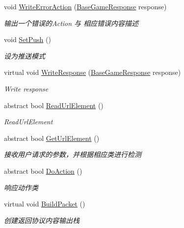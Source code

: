 \begin{DoxyCompactItemize}
void \mbox{\hyperlink{class_t_net_1_1_service_1_1_game_struct_a14afa6149ce4830eebbb13420cb24507}{Write\+Error\+Action}} (\mbox{\hyperlink{class_t_net_1_1_service_1_1_base_game_response}{Base\+Game\+Response}} response)
\begin{DoxyCompactList}\small\item\em 输出一个错误的\+Action 与 相应错误内容描述 \end{DoxyCompactList}\item 
void \mbox{\hyperlink{class_t_net_1_1_service_1_1_game_struct_a0d368920d892f3948113651765bbefc4}{Set\+Push}} ()
\begin{DoxyCompactList}\small\item\em 设为推送模式 \end{DoxyCompactList}\item 
virtual void \mbox{\hyperlink{class_t_net_1_1_service_1_1_game_struct_a1e9ea47b126ecae6d9b7e1c813d053b2}{Write\+Response}} (\mbox{\hyperlink{class_t_net_1_1_service_1_1_base_game_response}{Base\+Game\+Response}} response)
\begin{DoxyCompactList}\small\item\em Write response \end{DoxyCompactList}\item 
abstract bool \mbox{\hyperlink{class_t_net_1_1_service_1_1_game_struct_ab30ab74b0856742fd3da24539b94fb13}{Read\+Url\+Element}} ()
\begin{DoxyCompactList}\small\item\em Read\+Url\+Element \end{DoxyCompactList}\item 
abstract bool \mbox{\hyperlink{class_t_net_1_1_service_1_1_game_struct_ad4167cb7ce62183a1336ebc30a848bfc}{Get\+Url\+Element}} ()
\begin{DoxyCompactList}\small\item\em 接收用户请求的参数，并根据相应类进行检测 \end{DoxyCompactList}\item 
abstract bool \mbox{\hyperlink{class_t_net_1_1_service_1_1_game_struct_a7a4391eb55bba0a76637b1d58e6fdea9}{Do\+Action}} ()
\begin{DoxyCompactList}\small\item\em 响应动作类 \end{DoxyCompactList}\item 
virtual void \mbox{\hyperlink{class_t_net_1_1_service_1_1_game_struct_a07c2501acfc1957399e45b1c3539bc70}{Build\+Packet}} ()
\begin{DoxyCompactList}\small\item\em 创建返回协议内容输出栈 \end{DoxyCompactList}\end{DoxyCompactItemize}
